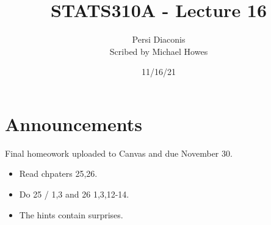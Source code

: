 




\title{STATS310A - Lecture 16}
\author{Persi Diaconis\\ Scribed by Michael Howes}
\date{11/16/21}

\pagestyle{fancy}
\fancyhf{}


\maketitle
\tableofcontents
\section{Announcements}
Final homeowork uploaded to Canvas and due November 30.
\begin{itemize}
    \item Read chpaters 25,26.
    \item Do 25 / 1,3 and 26 1,3,12-14.
    \item The hints contain surprises.
\end{itemize}
